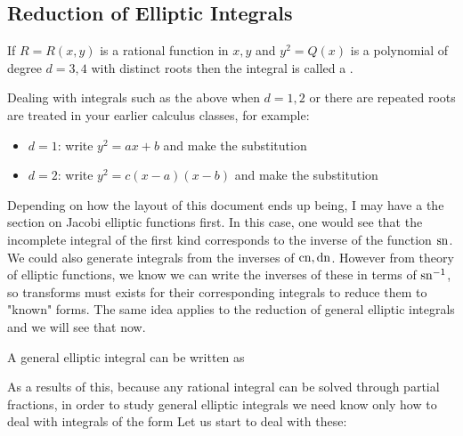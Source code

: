 \documentclass{article}
\begin{document}
\subsection{Reduction of Elliptic Integrals}

\begin{definition}
	If $R=R(x,y)$ is a rational function in $x,y$ and $y^2=Q(x)$ is a polynomial of degree $d=3,4$ with distinct roots then the integral
	is called a . 
\end{definition}

\begin{remark}
	Dealing with integrals such as the above when $d=1,2$ or there are repeated roots are treated in your earlier calculus classes, for example:
	\begin{itemize}
		\item $d=1$: write $y^2 = ax+b$ and make the substitution 
		\item $d=2$: write $y^2 = c(x-a)(x-b)$ and make the substitution 
	\end{itemize}
\end{remark}

\begin{remark}
	Depending on how the layout of this document ends up being, I may have a the section on Jacobi elliptic functions first. In this case, one would see that the incomplete integral of the first kind corresponds to the inverse of the function $\operatorname{sn}$. We could also generate integrals from the inverses of $\operatorname{cn}, \operatorname{dn}$. However from theory of elliptic functions, we know we can write the inverses of these in terms of $\operatorname{sn}^{-1}$, so transforms must exists for their corresponding integrals to reduce them to "known" forms. The same idea applies to the reduction of general elliptic integrals and we will see that now. 
\end{remark}

\begin{prop}
	A general elliptic integral can be written as 
\end{prop}
As a results of this, because any rational integral can be solved through partial fractions, in order to study general elliptic integrals we need know only how to deal with integrals of the form 
Let us start to deal with these:
\end{document}
